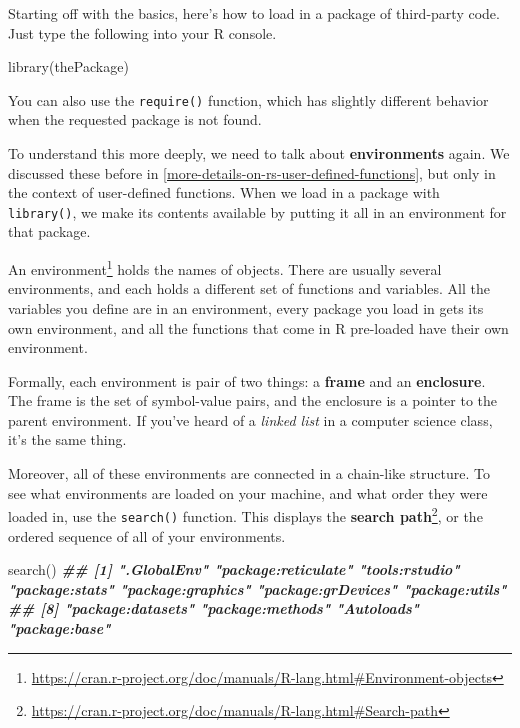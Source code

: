 \documentclass[
  12pt,
  krantz2]{krantz}
\makeatletter
\newenvironment{Shaded}{\begin{snugshade}}{\end{snugshade}}
\newcommand{\DocumentationTok}[1]{\textcolor[rgb]{0.37,0.37,0.37}{\textbf{\textit{#1}}}}
\newcommand{\FunctionTok}[1]{\textcolor[rgb]{0,0,0}{#1}}
\newcommand{\NormalTok}[1]{#1}
\renewcommand{\href}[2]{#2\footnote{\url{#1}}}
\newenvironment{kframe}{%
\medskip{}
\setlength{\fboxsep}{.8em}
 \def\at@end@of@kframe{}%
 \ifinner\ifhmode%
  \def\at@end@of@kframe{\end{minipage}}%
  \begin{minipage}{\columnwidth}%
 \fi\fi%
 \def\FrameCommand##1{\hskip\@totalleftmargin \hskip-\fboxsep
 \colorbox{shadecolor}{##1}\hskip-\fboxsep
     \hskip-\linewidth \hskip-\@totalleftmargin \hskip\columnwidth}%
 \MakeFramed {\advance\hsize-\width
   \@totalleftmargin\z@ \linewidth\hsize
   \@setminipage}}%
 {\par\unskip\endMakeFramed%
 \at@end@of@kframe}
\renewenvironment{Shaded}{\begin{kframe}}{\end{kframe}}
\makeatother
\begin{document}
Starting off with the basics, here's how to load in a package of third-party code. Just type the following into your R console.

\begin{Shaded}
\begin{Highlighting}[]
\FunctionTok{library}\NormalTok{(thePackage)}
\end{Highlighting}
\end{Shaded}

You can also use the \texttt{require()} function, which has slightly different behavior when the requested package is not found.

To understand this more deeply, we need to talk about \textbf{environments} again. We discussed these before in \ref{more-details-on-rs-user-defined-functions}, but only in the context of user-defined functions. When we load in a package with \texttt{library()}, we make its contents available by putting it all in an environment for that package.

An \href{https://cran.r-project.org/doc/manuals/R-lang.html\#Environment-objects}{environment} holds the names of objects. There are usually several environments, and each holds a different set of functions and variables. All the variables you define are in an environment, every package you load in gets its own environment, and all the functions that come in R pre-loaded have their own environment.

Formally, each environment is pair of two things: a \textbf{frame} and an \textbf{enclosure}. The frame is the set of symbol-value pairs, and the enclosure is a pointer to the parent environment. If you've heard of a \emph{linked list} in a computer science class, it's the same thing.

Moreover, all of these environments are connected in a chain-like structure. To see what environments are loaded on your machine, and what order they were loaded in, use the \texttt{search()} function. This displays the \href{https://cran.r-project.org/doc/manuals/R-lang.html\#Search-path}{\textbf{search path}}, or the ordered sequence of all of your environments.

\begin{Shaded}
\begin{Highlighting}[]
\FunctionTok{search}\NormalTok{()}
\DocumentationTok{\#\#  [1] ".GlobalEnv"         "package:reticulate" "tools:rstudio"      "package:stats"      "package:graphics"   "package:grDevices"  "package:utils"     }
\DocumentationTok{\#\#  [8] "package:datasets"   "package:methods"    "Autoloads"          "package:base"}
\end{Highlighting}
\end{Shaded}
\end{document}
